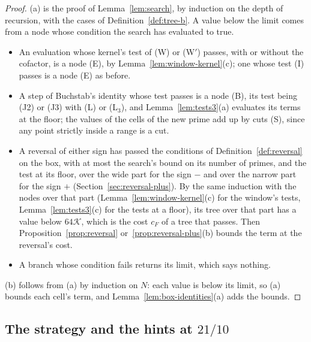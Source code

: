\documentclass[11pt]{article}
\theoremstyle{definition}
\begin{document}
\begin{proof}
(a) is the proof of Lemma~\ref{lem:search}, by induction on the depth of recursion, with the cases of
Definition~\ref{def:tree-b}. A value below the limit comes from a node whose condition the search has evaluated to true.
\begin{itemize}
\item An evaluation whose kernel's test of (W) or (W$'$) passes, with or without the cofactor, is a node (E), by
  Lemma~\ref{lem:window-kernel}(c); one whose test (I) passes is a node (E) as before.
\item A step of Buchstab's identity whose test passes is a node (B), its test being (J2) or (J3) with (L) or (L$_3$),
  and Lemma~\ref{lem:tests3}(a) evaluates its terms at the floor; the values of the cells of the new prime add up by
  cuts (S), since any point strictly inside a range is a cut.
\item A reversal of either sign has passed the conditions of Definition~\ref{def:reversal} on the box, with at most the
  search's bound on its number of primes, and the test at its floor, over the wide part for the sign $-$ and over the
  narrow part for the sign $+$ (Section~\ref{sec:reversal-plus}). By the same induction with the nodes over that part
  (Lemma~\ref{lem:window-kernel}(c) for the window's tests, Lemma~\ref{lem:tests3}(c) for the tests at a floor), its
  tree over that part has a value below $64\mathcal K$, which is the cost $c_F$ of a tree that passes. Then
  Proposition~\ref{prop:reversal} or~\ref{prop:reversal-plus}(b) bounds the term at the reversal's cost.
\item A branch whose condition fails returns its limit, which says nothing.
\end{itemize}
(b) follows from (a) by induction on $N$: each value is below its limit, so (a) bounds each cell's
term, and Lemma~\ref{lem:box-identities}(a) adds the bounds.
\end{proof}

\subsection{The strategy and the hints at \texorpdfstring{$21/10$}{21/10}}
\end{document}

